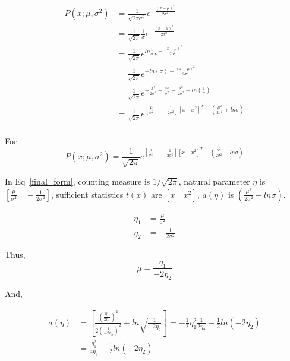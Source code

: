 \documentclass{article}
\begin{document}
\begin{align*}
P(x; \mu, \sigma^2)&=\frac{1}{\sqrt{2\pi\sigma^2}}e^{-\frac{(x-\mu)^2}{2\sigma^2}}\\
&=\frac{1}{\sqrt{2\pi}}\frac{1}{\sigma}e^{-\frac{(x-\mu)^2}{2\sigma^2}}\\
&=\frac{1}{\sqrt{2\pi}}e^{ln{\frac{1}{\sigma}}}e^{-\frac{(x-\mu)^2}{2\sigma^2}}\\
&=\frac{1}{\sqrt{2\pi}}e^{-ln(\sigma)-\frac{(x-\mu)^2}{2\sigma^2}}\\
&=\frac{1}{\sqrt{2\pi}}e^{-\frac{x^2}{2\sigma^2}+\frac{\mu x}{\sigma^2}-\frac{\mu^2}{2\sigma^2}+ln(\frac{1}{\sigma})}\\
&=\frac{1}{\sqrt{2\pi}}e^{[
\frac{\mu}{\sigma^2}\quad-\frac{1}{2\sigma^2}]
[x\quad x^2]^T-\left(\frac{\mu^2}{2\sigma^2}+ln\sigma\right)}\\
\end{align*}

For
\begin{equation}\label{final_form}
  P(x; \mu, \sigma^2)= \frac{1}{\sqrt{2\pi}}e^{[
\frac{\mu}{\sigma^2}\quad-\frac{1}{2\sigma^2}]
[x\quad x^2]^T-\left(\frac{\mu^2}{2\sigma^2}+ln\sigma\right)}
\end{equation}

In Eq~\ref{final_form}, counting measure is $1/\sqrt{2\pi}$, natural parameter $\eta$ is $[
\frac{\mu}{\sigma^2}\quad-\frac{1}{2\sigma^2}]$, sufficient statistics $t(x)$ are $[x\quad x^2]$, $a(\eta)$ is $\left(\frac{\mu^2}{2\sigma^2}+ln\sigma\right)$.

\begin{align*}
    \eta_1&=\frac{\mu}{\sigma^2}\\
    \eta_2&=-\frac{1}{2\sigma^2}
\end{align*}

Thus, 
$$
\mu=\frac{\eta_1}{-2\eta_2}
$$

And,

\begin{align*}
a(\eta)&=\left[\frac{(\frac{\eta_1}{2\eta_2})^2}{2(\frac{1}{-2\eta_2})^2}+ln\sqrt{\frac{1}{-2\eta_2}}\right]=-\frac{1}{2}\eta_1^2\frac{1}{2\eta_2}-\frac{1}{2}ln(-2\eta_2)\\
&=\frac{\eta_1^2}{4\eta_2}-\frac{1}{2}ln(-2\eta_2)\\
\end{align*}
\end{document}
